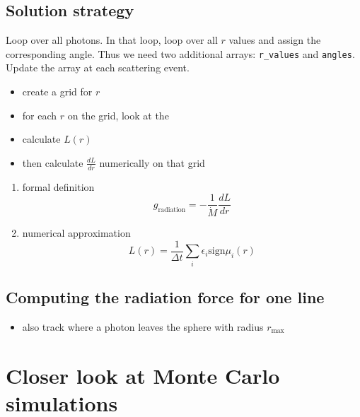 \documentclass[../main/main.tex]{subfiles}
\begin{document}
\subsection{Solution strategy}
Loop over all photons. In that loop, loop over all $r$ values and assign the corresponding angle. Thus we need two additional arrays: \texttt{r\_values} and \texttt{angles}. Update the array at each scattering event.


\begin{itemize}
\item create a grid for $r$
\item for each $r$ on the grid, look at the 
\item calculate $L(r)$
\item then calculate $\frac{dL}{dr}$ numerically on that grid
\end{itemize}

\begin{enumerate}
\item formal definition
\begin{equation}
g_{\text{radiation}} = - \frac{1}{\dot{M}}\frac{dL}{dr}
\end{equation}
\item numerical approximation 
\begin{equation}
L(r) = \frac{1}{\Delta t} \sum_i \epsilon_i \text{sign}\mu_i(r)
\end{equation}
\end{enumerate}


\subsection{Computing the radiation force for one line}
\begin{itemize}
\item also track where a photon leaves the sphere with radius $r_{\text{max}}$
\end{itemize}


\newpage
\section{Closer look at Monte Carlo simulations}
\label{diffusion_Monte_Carlo_mean_free_path}
\end{document}
